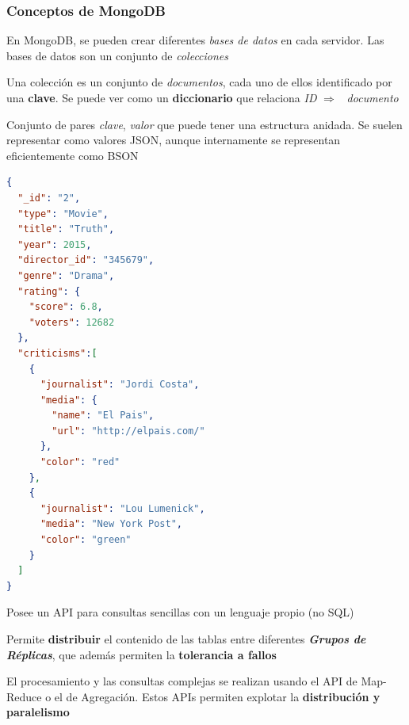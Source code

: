 \documentclass[14pt]{beamer}
\newcommand{\ra}{{\color{blue} $\Rightarrow${}~{}}}
\begin{document}
\begin{frame}
  \frametitle{Conceptos de MongoDB}
  \begin{description}[abc]
  \item[Base de datos] En MongoDB, se pueden crear diferentes {\em bases de
      datos} en cada servidor. Las bases de datos son un conjunto de {\em
      colecciones}
  \item[Colección] Una colección es un conjunto de {\em
      documentos}, cada uno de ellos identificado por una {\bf clave}. Se
    puede ver como un {\bf diccionario} que relaciona {\em ID} \ra{} {\em
      documento}
  \item[Documento] Conjunto de pares {\em clave}, {\em valor} que puede
    tener una estructura anidada. Se suelen representar como valores JSON,
    aunque internamente se representan eficientemente como BSON
  \end{description}

  \framebreak

\begin{lstlisting}[language=json,basicstyle=\tiny\tt]
{
  "_id": "2",
  "type": "Movie",
  "title": "Truth",
  "year": 2015,
  "director_id": "345679",
  "genre": "Drama",
  "rating": {
    "score": 6.8,
    "voters": 12682
  },
  "criticisms":[
    {
      "journalist": "Jordi Costa",
      "media": {
        "name": "El Pais",
        "url": "http://elpais.com/"
      },
      "color": "red"
    },
    {
      "journalist": "Lou Lumenick",
      "media": "New York Post",
      "color": "green"
    }
  ]
}
\end{lstlisting}

  \framebreak

  \begin{description}[abc]
  \item[Consultas] Posee un API para consultas sencillas con un lenguaje
    propio (no SQL)
  \item[Distribución] Permite {\bf distribuir} el contenido de las tablas
    entre diferentes {\bfseries\itshape Grupos de Réplicas}, que además
    permiten la {\bf tolerancia a fallos}
  \item[Procesamiento/Consultas complejas] El procesamiento y las consultas
    complejas se realizan usando el API de Map-Reduce o el de Agregación.
    Estos APIs permiten explotar la {\bf distribución y paralelismo}
  \end{description}

\end{frame}
\end{document}
